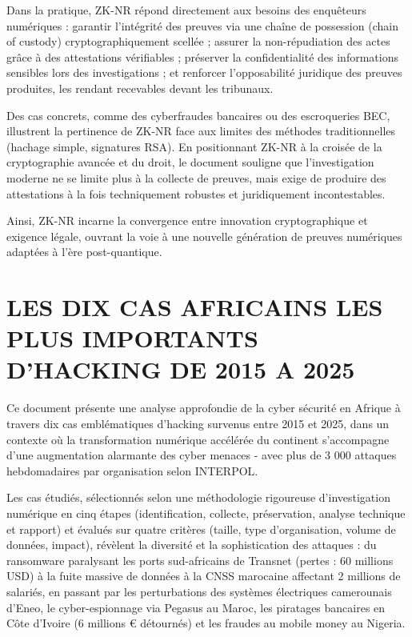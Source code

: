 \documentclass[12pt,a4paper]{article}
\begin{document}
Dans la pratique, ZK-NR répond directement aux besoins des enquêteurs numériques : garantir l'intégrité des preuves via une chaîne de possession (chain of custody) cryptographiquement scellée ; assurer la non-répudiation des actes grâce à des attestations vérifiables ; préserver la confidentialité des informations sensibles lors des investigations ; et renforcer l'opposabilité juridique des preuves produites, les rendant recevables devant les tribunaux. 

Des cas concrets, comme des cyberfraudes bancaires ou des escroqueries BEC, illustrent la pertinence de ZK-NR face aux limites des méthodes traditionnelles (hachage simple, signatures RSA). En positionnant ZK-NR à la croisée de la cryptographie avancée et du droit, le document souligne que l'investigation moderne ne se limite plus à la collecte de preuves, mais exige de produire des attestations à la fois techniquement robustes et juridiquement incontestables. 

Ainsi, ZK-NR incarne la convergence entre innovation cryptographique et exigence légale, ouvrant la voie à une nouvelle génération de preuves numériques adaptées à l'ère post-quantique.

\section{LES DIX CAS AFRICAINS LES PLUS IMPORTANTS D'HACKING DE 2015 A 2025}

Ce document présente une analyse approfondie de la cyber sécurité en Afrique à travers dix cas emblématiques d'hacking survenus entre 2015 et 2025, dans un contexte où la transformation numérique accélérée du continent s'accompagne d'une augmentation alarmante des cyber menaces - avec plus de 3 000 attaques hebdomadaires par organisation selon INTERPOL. 

Les cas étudiés, sélectionnés selon une méthodologie rigoureuse d'investigation numérique en cinq étapes (identification, collecte, préservation, analyse technique et rapport) et évalués sur quatre critères (taille, type d'organisation, volume de données, impact), révèlent la diversité et la sophistication des attaques : du ransomware paralysant les ports sud-africains de Transnet (pertes : 60 millions USD) à la fuite massive de données à la CNSS marocaine affectant 2 millions de salariés, en passant par les perturbations des systèmes électriques camerounais d'Eneo, le cyber-espionnage via Pegasus au Maroc, les piratages bancaires en Côte d'Ivoire (6 millions € détournés) et les fraudes au mobile money au Nigeria. 
\end{document}
